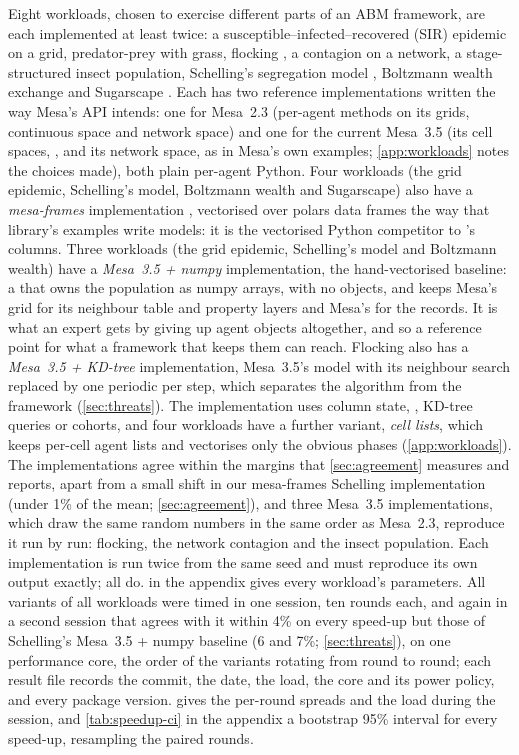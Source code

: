 Eight workloads, chosen to exercise different parts of an ABM framework, are each implemented
at least twice: a susceptible--infected--recovered (SIR) epidemic on a grid, predator-prey with grass, flocking
\citep{reynolds1987flocks}, a contagion on a network, a stage-structured insect population,
Schelling's segregation model \citep{schelling1971dynamic}, Boltzmann wealth exchange
\citep{dragulescu2000statistical} and Sugarscape \citep{epstein1996growing}. Each has two
reference implementations written the way Mesa's API intends: one for Mesa~2.3 (per-agent
methods on its grids, continuous space and network space) and one for the current Mesa~3.5
(its cell spaces, ,  and its network space, as in
Mesa's own examples; \cref{app:workloads} notes the choices made), both plain per-agent
Python. Four workloads (the grid epidemic, Schelling's model,
Boltzmann wealth and Sugarscape) also have a \emph{mesa-frames} implementation
\citep{mesaframes}, vectorised over polars data frames the way that library's examples write
models: it is the vectorised Python competitor to \modelly{}'s columns. Three workloads (the
grid epidemic, Schelling's model and Boltzmann wealth) have a \emph{Mesa~3.5 + numpy}
implementation, the hand-vectorised baseline: a  that owns the population as
numpy arrays, with no  objects, and keeps Mesa's grid for its neighbour table and
property layers and Mesa's  for the records. It is what an expert gets by
giving up agent objects altogether, and so a reference point for what a framework that keeps them
can reach. Flocking also has a \emph{Mesa~3.5 + KD-tree} implementation, Mesa~3.5's model with
its neighbour search replaced by one periodic  per step, which
separates the algorithm from the framework (\cref{sec:threats}). The \modelly{}
implementation uses column state, , KD-tree queries or cohorts, and four
workloads have a further \modelly{} variant, \emph{cell lists}, which keeps per-cell
agent lists and vectorises only the obvious phases (\cref{app:workloads}). The
implementations agree within the margins that \cref{sec:agreement} measures and reports,
apart from a small shift in our mesa-frames Schelling implementation (under 1\% of the mean;
\cref{sec:agreement}), and three Mesa~3.5
implementations, which draw the same random numbers in the same order as Mesa~2.3, reproduce
it run by run: flocking, the network contagion and the insect population. Each implementation
is run twice from the same seed and must reproduce its own output exactly; all do.
 in the appendix gives every workload's parameters. All variants of all
workloads were timed in one session, ten rounds each, and again in a second session that
agrees with it within 4\% on every speed-up but those of Schelling's Mesa~3.5 + numpy
baseline (6 and 7\%; \cref{sec:threats}), on one performance core, the order of
the variants rotating from round to round; each result file records the commit, the date, the
load, the core and its power policy, and every package version.  gives the
per-round spreads and the load during the session, and \cref{tab:speedup-ci} in the appendix a
bootstrap 95\% interval for every speed-up, resampling the paired rounds.

